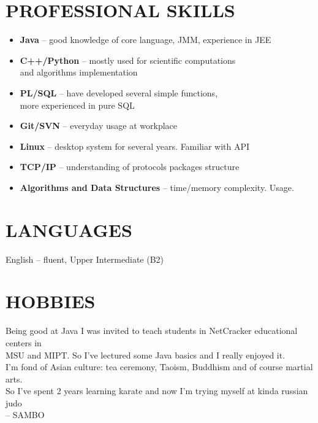 \documentclass[margin,12pt]{res}
\begin{document}
\begin{resume}
\section{PROFESSIONAL SKILLS}
\begin{itemize} \itemsep -2pt
  \item \textbf{Java} -- good knowledge of core language, JMM, experience in JEE\\
  \item \textbf{C++/Python} -- mostly used for scientific computations\\
 and algorithms implementation\\
  \item \textbf{PL/SQL} -- have developed several simple functions,\\
   more experienced in pure SQL\\
  \item \textbf{Git/SVN} -- everyday usage at workplace\\
  \item \textbf{Linux} -- desktop system for several years. Familiar with API\\
  \item \textbf{TCP/IP} -- understanding of protocols packages structure\\
  \item \textbf{Algorithms and Data Structures} -- time/memory complexity. Usage.
\end{itemize}
\section{LANGUAGES} 
English -- fluent, Upper Intermediate (B2)
\section{HOBBIES}
Being good at Java I was invited to teach students in NetCracker
educational centers in\\
 MSU and MIPT. So I've lectured some Java basics
and I really enjoyed it.\\
I'm fond of Asian culture: tea ceremony, Taoism, Buddhism and of course
martial arts.\\
So I've spent 2 years learning
karate and now I'm trying myself at kinda russian judo\\ -- SAMBO

\end{resume}
\end{document}
